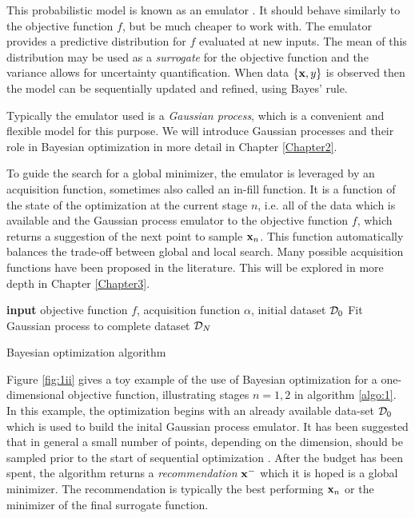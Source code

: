 This probabilistic model is known as an emulator \cite{lectures}. It should behave similarly to the objective function $f$, but be much cheaper to work with. The emulator provides a predictive distribution for $f$ evaluated at new inputs. The mean of this distribution may be used as a \textit{surrogate} for the objective function and the variance allows for uncertainty quantification.  When data $\{\mathbf{x}, y\}$ is observed then the model can be sequentially updated and refined, using Bayes' rule. 

Typically the emulator used is a \textit{Gaussian process}, which is a convenient and flexible model for this purpose. We will introduce Gaussian processes and their role in Bayesian optimization in more detail in Chapter \ref{Chapter2}.  

To guide the search for a global minimizer, the emulator is leveraged by an acquisition function, sometimes also called an in-fill function. It is a function of the state of the optimization at the current stage $n$, i.e. all of the data which is available and the Gaussian process emulator to the objective function $f$, which returns a suggestion of the next point to sample $\mathbf{x}_n$. This function automatically balances the trade-off between global and local search. Many possible acquisition functions have been proposed in the literature. This will be explored in more depth in Chapter \ref{Chapter3}. 

\begin{algorithm}
\SetAlgoLined
\textbf{input} objective function $f$, acquisition function $\alpha$, initial dataset $\mathcal{D}_0$\;
Fit Gaussian process to complete dataset $\mathcal{D}_{N}$\;
\;
\vspace{5pt}
\caption{Bayesian optimization algorithm} \label{algo:1}
\end{algorithm}

Figure \ref{fig:1ii} gives a toy example of the use of Bayesian optimization for a one-dimensional objective function, illustrating stages $n=1,2$ in algorithm \ref{algo:1}. In this example, the optimization begins with an already available data-set $\mathcal{D}_0$ which is used to build the inital Gaussian process emulator. It has been suggested that in general a small number of points, depending on the dimension, should be sampled prior to the start of sequential optimization \cite{bischl2017mlrmbo}. After the budget has been spent, the algorithm returns a \textit{recommendation} $\mathbf{x}^-$ which it is hoped is a global minimizer. The recommendation is typically the best performing $\mathbf{x}_n$ or the minimizer of the final surrogate function.

